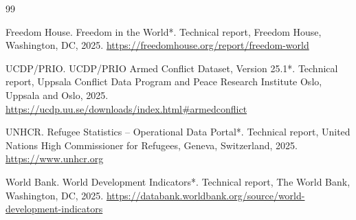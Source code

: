 \documentclass{article}
\theoremstyle{plain}
\theoremstyle{definition}
\theoremstyle{remark}
\begin{document}
\begin{thebibliography}{99} 

Freedom House.
\newblock *Freedom in the World*.
\newblock Technical report, Freedom House, Washington, DC, 2025.
\newblock \url{https://freedomhouse.org/report/freedom-world}

UCDP/PRIO.
\newblock *UCDP/PRIO Armed Conflict Dataset, Version 25.1*.
\newblock Technical report, Uppsala Conflict Data Program and Peace Research Institute Oslo, Uppsala and Oslo, 2025.
\newblock \url{https://ucdp.uu.se/downloads/index.html#armedconflict}

UNHCR.
\newblock *Refugee Statistics – Operational Data Portal*.
\newblock Technical report, United Nations High Commissioner for Refugees, Geneva, Switzerland, 2025.
\newblock \url{https://www.unhcr.org}

World Bank.
\newblock *World Development Indicators*.
\newblock Technical report, The World Bank, Washington, DC, 2025.
\newblock \url{https://databank.worldbank.org/source/world-development-indicators}

\end{thebibliography}
\end{document}
